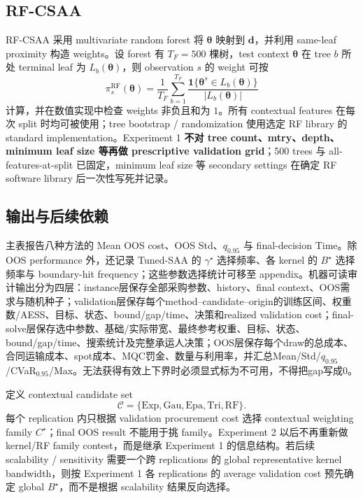 \documentclass[11pt,a4paper]{ctexart}
\begin{document}
\subsection{RF-CSAA}

RF-CSAA 采用 multivariate random forest 将 $\boldsymbol\theta$ 映射到 $\boldsymbol d$，并利用 same-leaf proximity 构造 weights。设 forest 有 $T_F=500$ 棵树，test context $\boldsymbol\theta$ 在 tree $b$ 所处 terminal leaf 为 $L_b(\boldsymbol\theta)$，则 observation $s$ 的 weight 可按
\[
\pi_s^{\mathrm{RF}}(\boldsymbol\theta)
=\frac1{T_F}\sum_{b=1}^{T_F}
\frac{\mathbf 1\{\boldsymbol\theta^s\in L_b(\boldsymbol\theta)\}}
{|L_b(\boldsymbol\theta)|}
\]
计算，并在数值实现中检查 weights 非负且和为 $1$。所有 contextual features 在每次 split 时均可被使用；tree bootstrap / randomization 使用选定 RF library 的 standard implementation。Experiment 1 \textbf{不对 tree count、mtry、depth、minimum leaf size 等再做 prescriptive validation grid}；500 trees 与 all-features-at-split 已固定，minimum leaf size 等 secondary settings 在确定 RF software library 后一次性写死并记录。

\subsection{输出与后续依赖}

主表报告八种方法的 Mean OOS cost、OOS Std、$q_{0.95}$ 与 final-decision Time。除 OOS performance 外，还记录 Tuned-SAA 的 $\gamma^\star$ 选择频率、各 kernel 的 $B^\star$ 选择频率与 boundary-hit frequency；这些参数选择统计可移至 appendix。机器可读审计输出分为四层：instance层保存全部采购参数、history、final context、OOS需求与随机种子；validation层保存每个method--candidate--origin的训练区间、权重数/AESS、目标、状态、bound/gap/time、决策和realized validation cost；final-solve层保存选中参数、基础/实际带宽、最终参考权重、目标、状态、bound/gap/time、搜索统计及完整承运人决策；OOS层保存每个draw的总成本、合同运输成本、spot成本、MQC罚金、数量与利用率，并汇总Mean/Std/$q_{0.95}$/CVaR$_{0.95}$/Max。无法获得有效上下界时必须显式标为不可用，不得把gap写成0。

定义 contextual candidate set
\[
\mathcal C=\{\text{Exp},\text{Gau},\text{Epa},\text{Tri},\text{RF}\}.
\]
每个 replication 内只根据 validation procurement cost 选择 contextual weighting family $C^\star$；final OOS result 不能用于挑 family。Experiment 2 以后不再重新做 kernel/RF family contest，而是继承 Experiment 1 的信息结构。若后续 scalability / sensitivity 需要一个跨 replications 的 global representative kernel bandwidth，则按 Experiment 1 各 replications 的 average validation cost 预先确定 global $B^\star$，而不是根据 scalability 结果反向选择。
\end{document}
